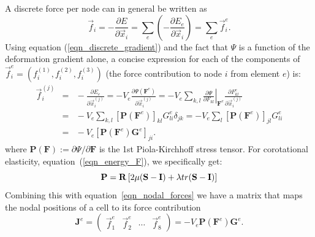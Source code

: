 A discrete force per node can in general be written as
\begin{equation}
\vec{f}_i=-\frac{\partial E}{\partial\vec{x}_i}=\sum_e\left(-\frac{\partial E_e}{\partial\vec{x}_i}\right)=\sum_e\vec{f}_i^e.
\label{eqn_elemental_forces}
\end{equation}
 Using equation (\ref{eqn_discrete_gradient}) and the fact that $\Psi$ is a function of the deformation gradient alone, a concise expression for each of the components
of $\vec{f}_i^e=(f_i^{(1)},f_i^{(2)},f_i^{(3)})$ (the force contribution to node $i$ from element $e$) is: 
\begin{eqnarray}
\vec{f}_i^{(j)}\!\!\!&\!\!\!=\!\!\!&\!\!\!-\frac{\partial E_e}{\partial\vec{x}_i^{(j)}}=-V_e\frac{\partial\Psi(\mathbf{F}^e)}{\partial\vec{x}_i^{(j)}}
=
-V_e\sum_{k,l}\left.\frac{\partial\Psi}{\partial F_{kl}}\right|_{\mathbf{F}^e}\frac{\partial F_{kl}^e}{\partial\vec{x}_i^{(j)}} \nonumber \\
\!\!\!&\!\!\!=\!\!\!&\!\!\!
-V_e\sum_{k,l}[\mathbf{P}(\mathbf{F}^e)]_{kl}G_{li}^e\delta_{jk}
=
-V_e\sum_l[\mathbf{P}(\mathbf{F}^e)]_{jl}G_{li}^e \nonumber \\
\!\!\!&\!\!\!=\!\!\!&\!\!\!
-V_e[\mathbf{P}(\mathbf{F}^e)\mathbf{G}^e]_{ji}.
\label{eqn_nodal_forces}
\end{eqnarray}
where $\mathbf{P}(\mathbf{F})\!:=\!\partial\Psi/\partial\mathbf{F}$ is the 1st Piola-Kirchhoff stress tensor.
For corotational elasticity, equation~(\ref{eqn_energy_F}), we specifically get:
\begin{equation}
\mathbf{P}=\mathbf{R}\left[2\mu(\mathbf{S}-\mathbf{I})+\lambda\\tr(\mathbf{S}-\mathbf{I})\right]
\label{eqn_piola_stress}\end{equation}
Combining this with equation~\ref{eqn_nodal_forces} we have a matrix
that maps the nodal positions of a cell to its force contribution
\begin{equation}
\mathbf{J}^e
=
\left(
\begin{array}{cccc}
\vec{f}_1^e &
\vec{f}_2^e &
\cdots &
\vec{f}_8^e
\end{array}
\right)
=-V_e\mathbf{P}(\mathbf{F}^e)\mathbf{G}^e.
\label{eqn_cell_forces}
\end{equation}

